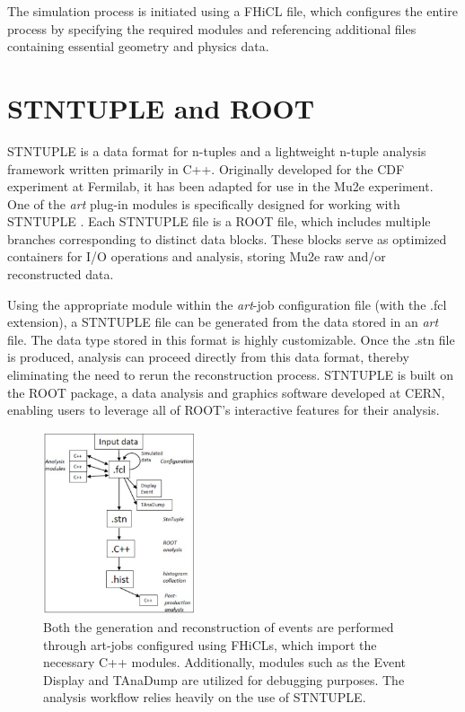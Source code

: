 The simulation process is initiated using a FHiCL file, which configures 
the entire process by specifying the required modules and referencing 
additional files containing essential geometry and physics data.

\section{STNTUPLE and ROOT}

STNTUPLE is a data format for n-tuples and a lightweight n-tuple analysis 
framework written primarily in C++. Originally developed for the CDF 
experiment at Fermilab, it has been adapted for use in the Mu2e experiment. 
One of the \textit{art} plug-in modules is specifically designed for working 
with STNTUPLE \cite{stntuple}. Each STNTUPLE file is a ROOT file, which 
includes multiple branches corresponding to distinct data blocks. These 
blocks serve as optimized containers for I/O operations and analysis, 
storing Mu2e raw and/or reconstructed data. 

Using the appropriate module within the \textit{art}-job configuration 
file (with the .fcl extension), a STNTUPLE file can be generated from the 
data stored in an \textit{art} file. The data type stored in this format 
is highly customizable. Once the .stn file is produced, analysis can 
proceed directly from this data format, thereby eliminating the need 
to rerun the reconstruction process. STNTUPLE is built on the ROOT package, 
a data analysis and graphics software developed at CERN, enabling users to 
leverage all of ROOT's interactive features for their analysis.


\begin{figure}[!h]
    \centering
    \includegraphics[width =0.4\textwidth]{figures/png/Screenshot_20240809_174458.png}
    \caption[Mu2e simulation and data handling.]{Both the generation and reconstruction 
    of events are performed through art-jobs configured using FHiCLs, which import the 
    necessary C++ modules. Additionally, modules such as the Event Display and TAnaDump 
    are utilized for debugging purposes. The analysis workflow relies heavily on the use 
    of STNTUPLE.
    }
    \label{fig:multistage}
\end{figure}

